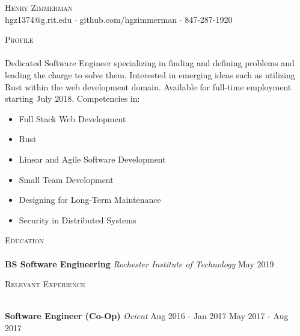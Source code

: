 \documentclass[a4paper]{article}
\newcommand{\lineunder} {
    \vspace*{-8pt} \\
    \hspace*{-18pt} \hrulefill \\
}
\newcommand{\header} [1] {
    {\hspace*{-18pt}\vspace*{6pt} \textsc{#1}}
    \vspace*{-6pt} \lineunder
}
\begin{document}
\vspace*{-40pt}

    

\vspace*{-10pt}
\begin{center}
	{\Huge \scshape {Henry Zimmerman}}\\
	hgz1374@g.rit.edu $\cdot$ github.com/hgzimmerman $\cdot$ 847-287-1920 \\
\end{center}



\header{Profile}
Dedicated Software Engineer specializing in finding and defining problems and leading the charge to solve them.
Interested in emerging ideas such as utilizing Rust within the web development domain.
Available for full-time employment starting July 2018.
Competencies in:

\begin{multicols}{2}
\begin{itemize} \itemsep -1mm
    \item Full Stack Web Development
    \item Rust
    \item Linear and Agile Software Development
    \item Small Team Development
    \item Designing for Long-Term Maintenance
    \item Security in Distributed Systems
\end{itemize}
\end{multicols}

\header{Education}
    \textbf{BS Software Engineering} \textit{Rochester Institute of Technology}  \hfill  May 2019\\
\vspace{2mm}

\header{Relevant Experience}
\vspace{1mm}

 
\textbf{Software Engineer (Co-Op)} \textit{Ocient} \hfill Aug 2016 - Jan 2017 \textbar{} May 2017 - Aug 2017\\
\end{document}
